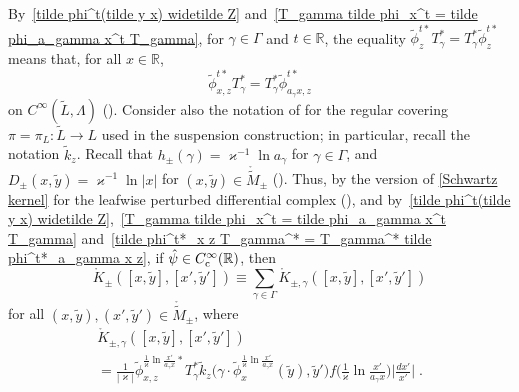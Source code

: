 \documentclass{memo-l}
\theoremstyle{plain}
\theoremstyle{definition}
\theoremstyle{remark}
\newcommand{\R}{\mathbb{R}}
\newcommand{\Cinftyc}{C^\infty_{\text{\rm c}}}
\numberwithin{section}{chapter}
\numberwithin{equation}{section}%
\begin{document}
By~\eqref{tilde phi^t(tilde y x) widetilde Z} and~\eqref{T_gamma tilde phi_x^t = tilde phi_a_gamma x^t T_gamma}, for $\gamma\in\Gamma$ and $t\in\R$, the equality $\tilde\phi^{t*}_zT_\gamma^*=T_\gamma^*\tilde\phi^{t*}_z$ means that, for all $x\in\R$,
\begin{equation}\label{tilde phi^t*_x z T_gamma^* = T_gamma^* tilde phi^t*_a_gamma x z}
\tilde\phi^{t*}_{x,z}T_\gamma^*=T_\gamma^*\tilde\phi^{t*}_{a_\gamma x,z}
\end{equation}
on $C^\infty(\widetilde L,\Lambda)$ (). Consider also the notation of  for the regular covering $\pi=\pi_L:\widetilde L\to L$ used in the suspension construction; in particular, recall the notation $\tilde k_z$. Recall that $h_\pm(\gamma)=\varkappa^{-1}\ln a_\gamma$ for $\gamma\in\Gamma$, and $D_\pm(x,\tilde y)=\varkappa^{-1}\ln|x|$ for $(x,\tilde y)\in\mathring{\widetilde M}_\pm$ (). Thus, by the version of \eqref{Schwartz kernel} for the leafwise perturbed differential complex (), and by~\eqref{tilde phi^t(tilde y x) widetilde Z},~\eqref{T_gamma tilde phi_x^t = tilde phi_a_gamma x^t T_gamma} and~\eqref{tilde phi^t*_x z T_gamma^* = T_gamma^* tilde phi^t*_a_gamma x z}, if $\hat\psi\in\Cinftyc(\R)$, then
\begin{equation}\label{mathring K_pm([tilde y x] [tilde y' x'])}
\mathring K_\pm([x,\tilde y],[x',\tilde y'])\equiv\sum_{\gamma\in \Gamma}\mathring K_{\pm,\gamma}([x,\tilde y],[x',\tilde y'])
\end{equation}
for all $(x,\tilde y),(x',\tilde y')\in\mathring{\widetilde M}_\pm$, where
\begin{multline}\label{mathring K_pm gamma([x tilde y] [x' tilde y'])}
\mathring K_{\pm,\gamma}([x,\tilde y],[x',\tilde y'])\\
=\frac{1}{|\varkappa|}
\tilde\phi_{x,z}^{\frac{1}{\varkappa}\ln\frac{x'}{a_\gamma x}*}T_\gamma^*
\tilde k_z\Big(\gamma\cdot\tilde\phi^{\frac{1}{\varkappa}\ln\frac{x'}{a_\gamma x}}_x(\tilde y),\tilde y'\Big)
f\Big(\frac{1}{\varkappa}\ln\frac{x'}{a_\gamma x}\Big)\Big|\frac{dx'}{x'}\Big|\;.
\end{multline}
\end{document}

